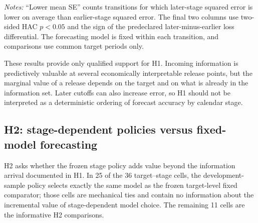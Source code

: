 \begin{table}[H]
\centering
\caption{H1: directional summary across all adjacent information-stage transitions}
\label{tab:h1_information_value}
\small
{}
\par\medskip
\begin{minipage}{0.92\textwidth}
\footnotesize
\textit{Notes:} ``Lower mean SE'' counts transitions for which later-stage
squared error is lower on average than earlier-stage squared error.  The final
two columns use two-sided HAC \(p<0.05\) and the sign of the predeclared
later-minus-earlier loss differential.  The forecasting model is fixed within
each transition, and comparisons use common target periods only.
\end{minipage}
\end{table}

These results provide only qualified support for H1.  Incoming information is
predictively valuable at several economically interpretable release points,
but the marginal value of a release depends on the target and on what is
already in the information set.  Later cutoffs can also increase error, so H1
should not be interpreted as a deterministic ordering of forecast accuracy by
calendar stage.

\subsection{H2: stage-dependent policies versus fixed-model forecasting}
\label{subsec:h2_results}

H2 asks whether the frozen stage policy adds value beyond the information
arrival documented in H1.  In 25 of the 36 target--stage cells, the
development-sample policy selects exactly the same model as the frozen
target-level fixed comparator; those cells are mechanical ties and contain no
information about the incremental value of stage-dependent model choice.  The
remaining 11 cells are the informative H2 comparisons.

